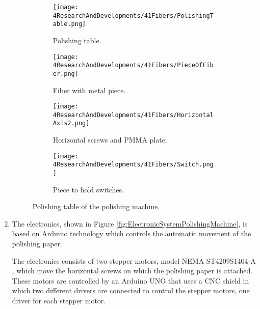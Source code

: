 \begin{enumerate}
\begin{figure}
\centering
    \begin{subfigure}[b]{0.55\textwidth}
    \centering
    \texttt{[image: 4ResearchAndDevelopments/41Fibers/PolishingTable.png]}  
    \caption{Polishing table.\label{subfig:PolishingTable}}
    \end{subfigure}
    \hfill
    \begin{subfigure}[b]{0.3\textwidth}
    \centering
    \texttt{[image: 4ResearchAndDevelopments/41Fibers/PieceOfFiber.png]}  
    \caption{Fiber with metal piece.\label{subfig:FiberMetailcPiece}}
    \end{subfigure}
    \hfill
    \begin{subfigure}[b]{0.55\textwidth}
    \centering
    \texttt{[image: 4ResearchAndDevelopments/41Fibers/HorizontalAxis2.png]}  
    \caption{Horizontal screws and PMMA plate.\label{subfig:HorizontalAxis}}
    \end{subfigure}
    \hfill
    \begin{subfigure}[b]{0.4\textwidth}
    \centering
    \texttt{[image: 4ResearchAndDevelopments/41Fibers/Switch.png]}  
    \caption{Piece to hold switches.\label{subfig:3DSwitchPiece}}
    \end{subfigure}
 \caption{Polishing table of the polishing machine.}
 \label{fig:PolishingTable}
\end{figure}

\item{} The electronics, shown in Figure \ref{fig:ElectronicSystemPolishingMachine}, is based on Arduino technology which controls the automatic movement of the polishing paper.

The electronics consists of two stepper motors, model NEMA ST4209S1404-A \cite{StepperMotors}, which move the horizontal screws on which the polishing paper is attached. These motors are controlled by an Arduino UNO \cite{ArduinoUNO} that uses a CNC shield \cite{CNCShield} in which two different drivers are connected to control the stepper motors, one driver for each stepper motor.


\end{enumerate}
